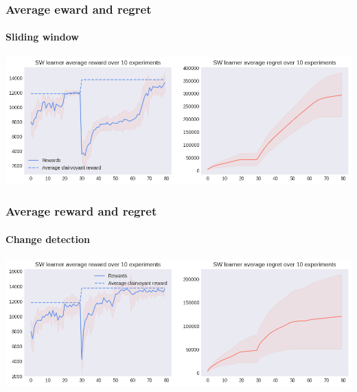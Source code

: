 
\begin{frame}[plain]

\frametitle{Average eward and regret}
\framesubtitle{Sliding window}

\begin{center}
    \hspace*{-2.8em}
    \includegraphics[scale=0.5]{img/Graphs/non_stationary/image2.png}
\end{center}

\end{frame}


\begin{frame}[plain]

\frametitle{Average reward and regret}
\framesubtitle{Change detection}

\begin{center}
    \hspace*{-2.8em}
    \includegraphics[scale=0.5]{img/Graphs/non_stationary/image3.png}
\end{center}

\end{frame}


